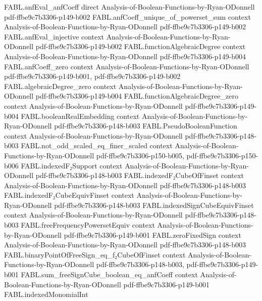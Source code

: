 \begin{theorem}
\proofstep
  {FABL.anfEval_anfCoeff}
  {direct}
  {Analysis-of-Boolean-Functions-by-Ryan-ODonnell}
  {pdf-ffbe9c7b3306-p149-b002}
\proofstep
  {FABL.anfCoeff_unique_of_powerset_sum}
  {context}
  {Analysis-of-Boolean-Functions-by-Ryan-ODonnell}
  {pdf-ffbe9c7b3306-p149-b002}
\proofstep
  {FABL.anfEval_injective}
  {context}
  {Analysis-of-Boolean-Functions-by-Ryan-ODonnell}
  {pdf-ffbe9c7b3306-p149-b002}
\proofstep
  {FABL.functionAlgebraicDegree}
  {context}
  {Analysis-of-Boolean-Functions-by-Ryan-ODonnell}
  {pdf-ffbe9c7b3306-p149-b004}
\proofstep
  {FABL.anfCoeff_zero}
  {context}
  {Analysis-of-Boolean-Functions-by-Ryan-ODonnell}
  {pdf-ffbe9c7b3306-p149-b001,
    pdf-ffbe9c7b3306-p149-b002}
\proofstep
  {FABL.algebraicDegree_zero}
  {context}
  {Analysis-of-Boolean-Functions-by-Ryan-ODonnell}
  {pdf-ffbe9c7b3306-p149-b004}
\proofstep
  {FABL.functionAlgebraicDegree_zero}
  {context}
  {Analysis-of-Boolean-Functions-by-Ryan-ODonnell}
  {pdf-ffbe9c7b3306-p149-b004}
\proofstep
  {FABL.booleanRealEmbedding}
  {context}
  {Analysis-of-Boolean-Functions-by-Ryan-ODonnell}
  {pdf-ffbe9c7b3306-p148-b003}
\proofstep
  {FABL.PseudoBooleanFunction}
  {context}
  {Analysis-of-Boolean-Functions-by-Ryan-ODonnell}
  {pdf-ffbe9c7b3306-p148-b003}
\proofstep
  {FABL.not_odd_scaled_eq_finer_scaled}
  {context}
  {Analysis-of-Boolean-Functions-by-Ryan-ODonnell}
  {pdf-ffbe9c7b3306-p150-b005,
    pdf-ffbe9c7b3306-p150-b006}
\proofstep
  {FABL.indexedF₂Support}
  {context}
  {Analysis-of-Boolean-Functions-by-Ryan-ODonnell}
  {pdf-ffbe9c7b3306-p148-b003}
\proofstep
  {FABL.indexedF₂CubeOfFinset}
  {context}
  {Analysis-of-Boolean-Functions-by-Ryan-ODonnell}
  {pdf-ffbe9c7b3306-p148-b003}
\proofstep
  {FABL.indexedF₂CubeEquivFinset}
  {context}
  {Analysis-of-Boolean-Functions-by-Ryan-ODonnell}
  {pdf-ffbe9c7b3306-p148-b003}
\proofstep
  {FABL.indexedSignCubeEquivFinset}
  {context}
  {Analysis-of-Boolean-Functions-by-Ryan-ODonnell}
  {pdf-ffbe9c7b3306-p148-b003}
\proofstep
  {FABL.freeFrequencyPowersetEquiv}
  {context}
  {Analysis-of-Boolean-Functions-by-Ryan-ODonnell}
  {pdf-ffbe9c7b3306-p149-b001}
\proofstep
  {FABL.zeroFixedSign}
  {context}
  {Analysis-of-Boolean-Functions-by-Ryan-ODonnell}
  {pdf-ffbe9c7b3306-p148-b003}
\proofstep
  {FABL.binaryPointOfFreeSign_eq_f₂CubeOfFinset}
  {context}
  {Analysis-of-Boolean-Functions-by-Ryan-ODonnell}
  {pdf-ffbe9c7b3306-p148-b003,
    pdf-ffbe9c7b3306-p149-b001}
\proofstep
  {FABL.sum_freeSignCube_boolean_eq_anfCoeff}
  {context}
  {Analysis-of-Boolean-Functions-by-Ryan-ODonnell}
  {pdf-ffbe9c7b3306-p149-b001}
\proofstep
  {FABL.indexedMonomialInt}

\end{theorem}
